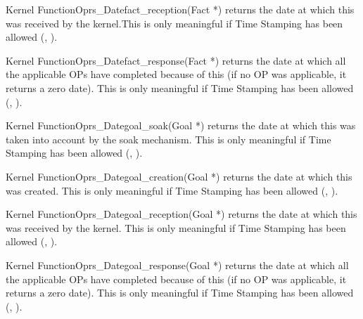 \begin{typefn}{Kernel Function}{Oprs\_Date}{fact\_reception}{(Fact *)}
returns the date at which this  was received by the kernel.This is
only meaningful if Time Stamping has been allowed 
(, ). 
\end{typefn}

\begin{typefn}{Kernel Function}{Oprs\_Date}{fact\_response}{(Fact *)}
returns the date at which all the applicable OPs have completed because
of this  (if no OP was applicable, it returns a zero date). This is
only meaningful if Time Stamping has been allowed (, ).
\end{typefn}

\begin{typefn}{Kernel Function}{Oprs\_Date}{goal\_soak}{(Goal *)}
returns the date at which this  was taken into account by
the soak mechanism. This is only meaningful if Time Stamping has been allowed
(, ).
\end{typefn}

\begin{typefn}{Kernel Function}{Oprs\_Date}{goal\_creation}{(Goal *)}
returns the date at which this  was created. This is
only meaningful if Time Stamping has been allowed (, ). 
\end{typefn}

\begin{typefn}{Kernel Function}{Oprs\_Date}{goal\_reception}{(Goal *)}
returns the date at which this  was received by the kernel. This is
only meaningful if Time Stamping has been allowed (, ).
\end{typefn}

\begin{typefn}{Kernel Function}{Oprs\_Date}{goal\_response}{(Goal *)}
returns the date at which all the applicable OPs have completed because
of this  (if no OP was applicable, it returns a zero date). This is
only meaningful if Time Stamping has been allowed (, ).
\end{typefn}

